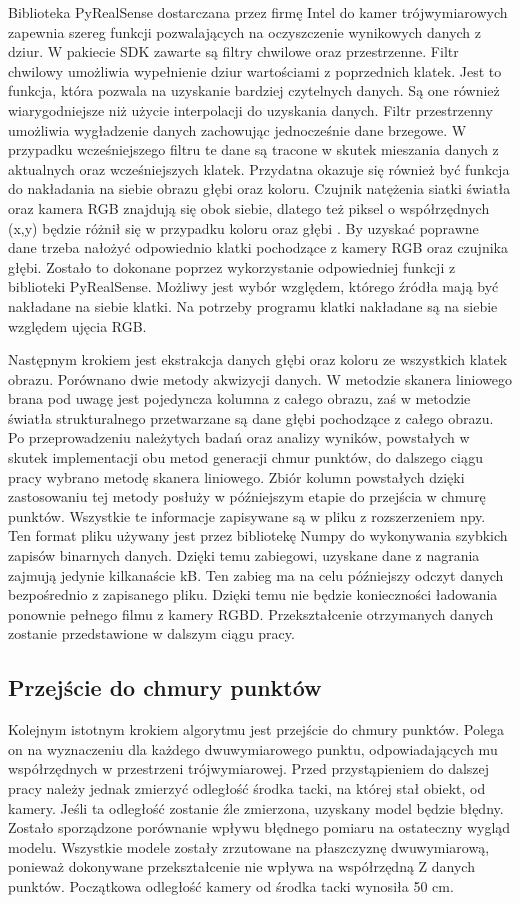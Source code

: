 Biblioteka PyRealSense dostarczana przez firmę Intel do kamer trójwymiarowych zapewnia szereg funkcji pozwalających na oczyszczenie wynikowych danych z dziur. W pakiecie SDK zawarte są filtry chwilowe oraz przestrzenne. Filtr chwilowy umożliwia wypełnienie dziur wartościami z poprzednich klatek. Jest to funkcja, która pozwala na uzyskanie bardziej czytelnych danych. Są one również wiarygodniejsze niż użycie interpolacji do uzyskania danych. Filtr przestrzenny umożliwia wygładzenie danych zachowując jednocześnie dane brzegowe. W przypadku wcześniejszego filtru te dane są tracone w skutek mieszania danych z aktualnych oraz wcześniejszych klatek. Przydatna okazuje się również być funkcja do nakładania na siebie obrazu głębi oraz koloru. Czujnik natężenia siatki światła oraz kamera RGB znajdują się obok siebie, dlatego też piksel o współrzędnych (x,y) będzie różnił się w przypadku koloru oraz głębi \cite{IntelRealSenseSheet}. By uzyskać poprawne dane trzeba nałożyć odpowiednio klatki pochodzące z kamery RGB oraz czujnika głębi. Zostało to dokonane poprzez wykorzystanie odpowiedniej funkcji z biblioteki PyRealSense. Możliwy jest wybór względem, którego źródła mają być nakładane na siebie klatki. Na potrzeby programu klatki nakładane są na siebie względem ujęcia RGB.

Następnym krokiem jest ekstrakcja danych głębi oraz koloru ze wszystkich klatek obrazu. Porównano dwie metody akwizycji danych. W metodzie skanera liniowego brana pod uwagę jest pojedyncza kolumna z całego obrazu, zaś w metodzie światła strukturalnego przetwarzane są dane głębi pochodzące z całego obrazu. Po przeprowadzeniu należytych badań oraz analizy wyników, powstałych w skutek implementacji obu metod generacji chmur punktów, do dalszego ciągu pracy wybrano metodę skanera liniowego. Zbiór kolumn powstałych dzięki zastosowaniu tej metody posłuży w późniejszym etapie do przejścia w chmurę punktów. Wszystkie te informacje zapisywane są w pliku z rozszerzeniem npy. Ten format pliku używany jest przez bibliotekę Numpy do wykonywania szybkich zapisów binarnych danych. Dzięki temu zabiegowi, uzyskane dane z nagrania zajmują jedynie kilkanaście kB. Ten zabieg ma na celu późniejszy odczyt danych bezpośrednio z zapisanego pliku. Dzięki temu nie będzie konieczności ładowania ponownie pełnego filmu z kamery RGBD. Przekształcenie otrzymanych danych zostanie przedstawione w dalszym ciągu pracy.
\subsection{Przejście do chmury punktów}
Kolejnym istotnym krokiem algorytmu jest przejście do chmury punktów. Polega on na wyznaczeniu dla każdego dwuwymiarowego punktu, odpowiadających mu współrzędnych w przestrzeni trójwymiarowej. Przed przystąpieniem do dalszej pracy należy jednak zmierzyć odległość środka tacki, na której stał obiekt, od kamery. Jeśli ta odległość zostanie źle zmierzona, uzyskany model będzie błędny. Zostało sporządzone porównanie wpływu błędnego pomiaru na ostateczny wygląd modelu. Wszystkie modele zostały zrzutowane na płaszczyznę dwuwymiarową, ponieważ dokonywane przekształcenie nie wpływa na współrzędną Z danych punktów. Początkowa odległość kamery od środka tacki wynosiła 50 cm.

